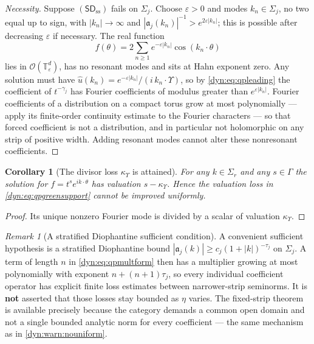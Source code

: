 \documentclass[11pt,letterpaper]{article}
\newtheorem{corollary}[corollary]{Corollary}
\theoremstyle{definition}
\theoremstyle{remark}
\newtheorem{remark}[remark]{Remark}
\newcommand{\OO}{\mathcal O}
\newcommand{\eps}{\varepsilon}
\newcommand{\sdss}{\mathsf{SD}_{\mathrm{ss}}}
\newcommand{\TT}{\mathbb T}
\newcommand{\kups}{\kappa_{\Upsilon}}
\newcommand{\fla}{\mathfrak a}
\numberwithin{equation}{section}
\begin{document}
\begin{proof}[Necessity]
Suppose $(\sdss)$ fails on $\Sigma_j$. Choose $\eps>0$ and modes
$k_n\in\Sigma_j$, no two equal up to sign, with $|k_n|\to\infty$ and
$|\fla_j(k_n)|^{-1}>e^{2\eps|k_n|}$; this is possible after decreasing
$\eps$ if necessary. The real function
\begin{equation}\label{dyn:eq:qpbadforcing}
 f(\theta)=2\sum_{n\ge1}e^{-\eps|k_n|}\cos(k_n\cdot\theta)
\end{equation}
lies in $\OO(\TT^{d}_\eps)$, has no resonant modes and sits at Hahn
exponent zero. Any solution must have
$\widehat u(k_n)=e^{-\eps|k_n|}/(i\,k_n\cdot\Upsilon)$, so by
\eqref{dyn:eq:qpleading} the coefficient of $t^{-\gamma_j}$ has Fourier
coefficients of modulus greater than $e^{\eps|k_n|}$. Fourier coefficients
of a distribution on a compact torus grow at most polynomially --- apply
its finite-order continuity estimate to the Fourier characters --- so that
forced coefficient is not a distribution, and in particular not holomorphic
on any strip of positive width. Adding resonant modes cannot alter these
nonresonant coefficients.
\end{proof}

\begin{corollary}[The divisor loss $\kups$ is attained]\label{dyn:cor:qpsharp}
For any $k\in\Sigma_r$ and any $s\in\Gamma$ the solution for
$f=t^{s}e^{ik\cdot\theta}$ has valuation $s-\kups$. Hence the valuation
loss in \eqref{dyn:eq:qpgreensupport} cannot be improved uniformly.
\end{corollary}
\begin{proof}
Its unique nonzero Fourier mode is divided by a scalar of valuation
$\kups$.
\end{proof}

\begin{remark}[A stratified Diophantine sufficient condition]
\label{dyn:rem:qpdiophantine}
A convenient sufficient hypothesis is a stratified Diophantine bound
$|\fla_j(k)|\ge c_j(1+|k|)^{-\tau_j}$ on $\Sigma_j$. A term of length $n$
in \eqref{dyn:eq:qpmultform} then has a multiplier growing at most
polynomially with exponent $n+(n+1)\tau_j$, so every individual coefficient
operator has explicit finite loss estimates between narrower-strip
seminorms. It is \textbf{not} asserted that those losses stay bounded as
$\eta$ varies. The fixed-strip theorem is available precisely because the
category demands a common open domain and not a single bounded analytic
norm for every coefficient --- the same mechanism as in
\cref{dyn:warn:nouniform}.
\end{remark}
\end{document}
